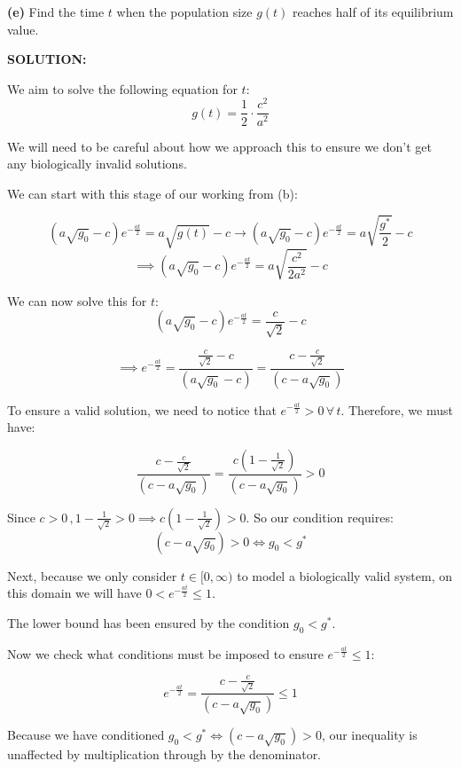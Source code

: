 \documentclass[]{article}
\begin{document}
\noindent \textbf{(e)} Find the time $t$ when the population size $g(t)$ reaches half of its equilibrium value.\newline

\noindent \textbf{SOLUTION:}\newline

We aim to solve the following equation for $t$:
\[
g(t) = \frac{1}{2} \cdot \frac{c^2}{a^2}
\]

We will need to be careful about how we approach this to ensure we don't \indent get any biologically invalid solutions.\newline

We can start with this stage of our working from (b):

\[
\left(a \sqrt{g_0}-c\right)e^{-\frac{at}{2}} = a \sqrt{g(t)}-c \to \left(a \sqrt{g_0}-c\right)e^{-\frac{at}{2}} = a \sqrt{\frac{g^*}{2}}-c
\]
\[
\implies \left(a \sqrt{g_0}-c\right)e^{-\frac{at}{2}} = a \sqrt{\frac{c^2}{2a^2}}-c
\]

We can now solve this for $t$:
\[ \left(a \sqrt{g_0}-c\right)e^{-\frac{at}{2}} = \frac{c}{\sqrt{2}}-c
\]

\[
\implies e^{-\frac{at}{2}} = \frac{\frac{c}{\sqrt{2}}-c}{ \left(a \sqrt{g_0}-c\right)} = \frac{c-\frac{c}{\sqrt{2}}}{ \left(c-a \sqrt{g_0}\right)}
\]

To ensure a valid solution, we need to notice that $e^{-\frac{at}{2}} > 0 \, \forall \, t$. Therefore, \indent we must have:

\[
\frac{c-\frac{c}{\sqrt{2}}}{ \left(c-a \sqrt{g_0}\right)} = \frac{c(1-\frac{1}{\sqrt{2}})}{ \left(c-a \sqrt{g_0}\right)}> 0
\]

Since $c > 0\, , 1-\frac{1}{\sqrt{2}}>0 \implies c(1-\frac{1}{\sqrt{2}})>0$. So our condition requires:
\[
\left(c-a \sqrt{g_0}\right) > 0 \iff g_0 < g^*
\]

Next, because we only consider $t\in[0,\infty)$ to model a biologically valid \indent system, on this domain we will have $0 <e^{-\frac{at}{2}} \leq 1$.\newline

The lower bound has been ensured by the condition $g_0 < g^*$. \newline

Now we check what conditions must be imposed to ensure $e^{-\frac{at}{2}} \leq 1$:

\[
e^{-\frac{at}{2}}  = \frac{c-\frac{c}{\sqrt{2}}}{ \left(c-a \sqrt{g_0}\right)} \leq 1
\]

Because we have conditioned $g_0 < g^* \iff \left(c-a \sqrt{g_0}\right) > 0 $, our inequality \indent is unaffected by multiplication through by the denominator.
\end{document}
